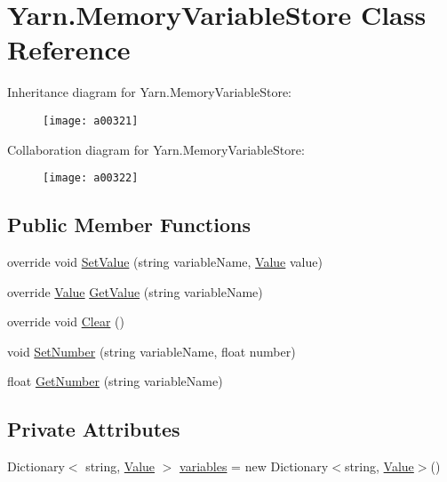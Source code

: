 \hypertarget{a00066}{\section{Yarn.\-Memory\-Variable\-Store Class Reference}
\label{a00066}
}


Inheritance diagram for Yarn.\-Memory\-Variable\-Store\-:
\nopagebreak
\begin{figure}[H]
\begin{center}
\leavevmode
\texttt{[image: a00321]}
\end{center}
\end{figure}


Collaboration diagram for Yarn.\-Memory\-Variable\-Store\-:
\nopagebreak
\begin{figure}[H]
\begin{center}
\leavevmode
\texttt{[image: a00322]}
\end{center}
\end{figure}
\subsection*{Public Member Functions}
\begin{DoxyCompactItemize}
\item 
override void \hyperlink{a00066_a653a459811e5c19549f4b31269093ef5}{Set\-Value} (string variable\-Name, \hyperlink{a00100}{Value} value)
\item 
override \hyperlink{a00100}{Value} \hyperlink{a00066_a0ce77e8245c504a777540e359704aa2a}{Get\-Value} (string variable\-Name)
\item 
override void \hyperlink{a00066_aa6d243e7ef02b91f793a221f509dae69}{Clear} ()
\item 
void \hyperlink{a00035_a48b93de9cd7ae61d0cd9583c8330d3ee}{Set\-Number} (string variable\-Name, float number)
\item 
float \hyperlink{a00035_a1b7f7f4468b2463e7b47986d99362279}{Get\-Number} (string variable\-Name)
\end{DoxyCompactItemize}
\subsection*{Private Attributes}
\begin{DoxyCompactItemize}
\item 
Dictionary$<$ string, \hyperlink{a00100}{Value} $>$ \hyperlink{a00066_aad18acd95297edb8ed496857337f8071}{variables} = new Dictionary$<$string, \hyperlink{a00100}{Value}$>$()
\end{DoxyCompactItemize}


